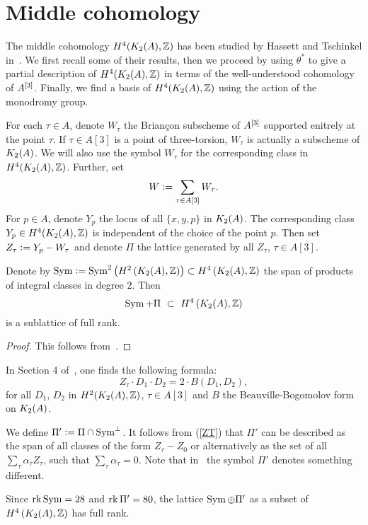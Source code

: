 
 \section{Middle cohomology}\label{Middle}
The middle cohomology $H^4(K_{ 2 }( A ),\mathbb{Z})$ has been studied by Hassett and Tschinkel in~\cite{Hassett}. We first recall some of their results,
then we proceed by using $\theta^*$ to give a partial description of $H^4(K_{ 2 }( A ),\mathbb{Z})$ in terms of the well-understood cohomology of $A^{[3]}$. 
Finally, we find a basis of $H^4(K_{ 2 }( A ),\mathbb{Z})$ using the action of the monodromy group.
\begin{notation}\label{TheZs}
For each $\tau \in A$, denote $W_\tau$ the Brian\c con subscheme of $A^{[3]}$ supported enitrely at the point $\tau$. If $\tau\in A[3]$ is a point of three-torsion, $W_\tau$ is actually a subscheme of $K_{ 2 }( A )$. We will also use the symbol $W_\tau$ for the corresponding class in $H^4(K_{ 2 }( A ),\mathbb{Z})$. Further, set 
$$
W \vcentcolon=  \sum_{\tau\in A[3]} W_\tau.
$$
For $p\in A$, denote $Y_p$ the locus of all $\{x,y,p\}$ in $K_{ 2 }( A )$. The corresponding class $Y_p \in H^4(K_{ 2 }( A ),\mathbb{Z})$ is independent of the choice of the point $p$. Then set $Z_\tau \vcentcolon=  Y_p - W_\tau$ and denote $\Pi$ the lattice generated by all $Z_\tau$, $\tau \in A[3]$.
\end{notation}
\begin{proposition}
Denote by $\operatorname{Sym} \vcentcolon=  \operatorname{Sym}^2\left(H^2\left(K_{ 2 }( A ),\mathbb{Z}\right)\right) \subset H^4\left(K_{ 2 }( A ),\mathbb{Z}\right) $ the span of products of integral classes in degree $2$.
Then 
$$
\Sym+\Pi \ \subset\  H^4\left(\X,\Z\right)
$$
is a sublattice  of full rank.  
\end{proposition}
\begin{proof}
This follows from~\cite[Proposition 4.3]{Hassett}.
\end{proof}

In Section 4 of~\cite{Hassett}, one finds the following formula:
\begin{equation}
Z_{\tau}\cdot D_{1}\cdot D_{2}=2\cdot B(D_{1},D_{2}),
\label{ZT}
\end{equation}
for all $D_{1}$, $D_{2}$ in $H^{2}(K_{ 2 }( A ),\mathbb{Z})$, $\tau\in A[3]$ and $B$ the Beauville-Bogomolov form on $K_{ 2 }( A )$.

\begin{definition}\label{defiPi}
We define $\Pi' \vcentcolon=  \Pi \cap \operatorname{Sym}^{\perp}$. It follows from (\ref{ZT}) that $\Pi'$ can be described as the span of all classes of the form $Z_\tau -Z_0$ or alternatively as the set of all
$
\sum_\tau \alpha_\tau Z_\tau $, such that $ \sum_\tau \alpha_\tau =0$.
Note that in~\cite{Hassett} the symbol $\Pi'$ denotes something different.
\end{definition}
\begin{remark}
Since $\operatorname{rk} \operatorname{Sym} = 28$ and $\operatorname{rk} \Pi' = 80$, the lattice $\operatorname{Sym}\oplus\Pi'$ as a subset of $H^4\left(K_{ 2 }( A ),\mathbb{Z}\right)$ has full rank.
\end{remark}

